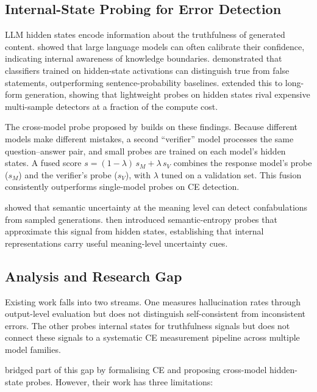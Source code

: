 \documentclass[12pt,twocolumn]{article}
\begin{document}
\subsection{Internal-State Probing for Error Detection}
\label{sec:bg-probing}

LLM hidden states encode information about the truthfulness of
generated content. \citet{kadavath2022language} showed that large
language models can often calibrate their confidence, indicating
internal awareness of knowledge boundaries.
\citet{azaria2023internal} demonstrated that classifiers trained on
hidden-state activations can distinguish true from false statements,
outperforming sentence-probability baselines.
\citet{han2025factuality} extended this to long-form generation,
showing that lightweight probes on hidden states rival expensive
multi-sample detectors at a fraction of the compute cost.

The cross-model probe proposed by \citet{tan2025consistent} builds
on these findings. Because different models make different mistakes,
a second ``verifier'' model processes the same question--answer pair,
and small probes are trained on each model's hidden states. A fused
score $s = (1-\lambda)\,s_M + \lambda\,s_V$ combines the response
model's probe ($s_M$) and the verifier's probe ($s_V$), with
$\lambda$ tuned on a validation set. This fusion consistently
outperforms single-model probes on CE detection.

\citet{farquhar2024semantic} showed that semantic uncertainty at the
meaning level can detect confabulations from sampled generations.
\citet{kossen2024semantic} then introduced semantic-entropy probes
that approximate this signal from hidden states, establishing that
internal representations carry useful meaning-level uncertainty cues.

\subsection{Analysis and Research Gap}
\label{sec:bg-gap}

Existing work falls into two streams. One measures hallucination
rates through output-level evaluation
\citep{lin2022truthfulqa, manakul2023selfcheckgpt} but does not
distinguish self-consistent from inconsistent errors. The other
probes internal states for truthfulness signals
\citep{azaria2023internal, han2025factuality} but does not connect
these signals to a systematic CE measurement pipeline across
multiple model families.

\citet{tan2025consistent} bridged part of this gap by formalising
CE and proposing cross-model hidden-state probes. However, their
work has three limitations:
\end{document}
